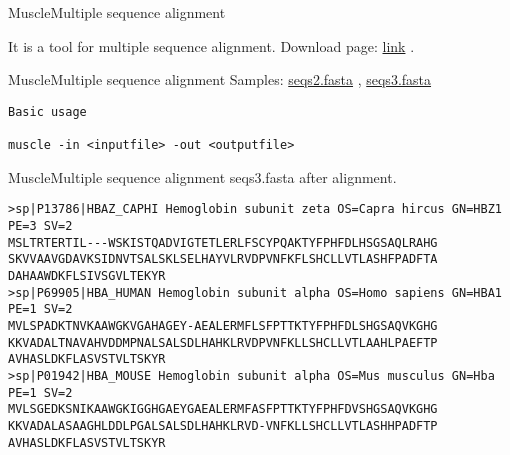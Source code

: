 \documentclass[10pt]{beamer}
\newcommand{\chref}[2]{	\href{#1}{{\usebeamercolor[bg]{Feather}#2}} }
\newcommand{\chref}[2]{	\href{#1}{{\color{blue}#2}}}
\newcommand{\1}{
	\setbeamertemplate{background}{
		\texttt{[image: img/1]}
		\tikz[overlay] \fill[fill opacity=0.75,fill=white] (0,0) rectangle (-\paperwidth,\paperheight);
	}
}
\begin{document}
\begin{frame}[fragile]{Muscle}{Multiple sequence alignment}
	\begin{block}{}
		It is a tool for multiple sequence alignment. Download page: \chref{http://www.drive5.com/muscle/downloads.htm}{link}.
	\end{block}
\end{frame}

\begin{frame}[fragile]{Muscle}{Multiple sequence alignment}
Samples: \chref{https://drive.google.com/file/d/11DYDDj3K5bn7mLcINEBQk8luO-HGsvgH/view?usp=sharing}{seqs2.fasta}, \chref{https://drive.google.com/file/d/1lPPD36R8e_BLvq2SxMvPWVyWHXtrJ-lz/view?usp=sharing}{seqs3.fasta}
\begin{lstlisting}[style=python]
Basic usage

muscle -in <inputfile> -out <outputfile>

\end{lstlisting}
\end{frame}


\begin{frame}[fragile]{Muscle}{Multiple sequence alignment}
	seqs3.fasta after alignment.
	\begin{lstlisting}[style=python]	
>sp|P13786|HBAZ_CAPHI Hemoglobin subunit zeta OS=Capra hircus GN=HBZ1 PE=3 SV=2 
MSLTRTERTIL---WSKISTQADVIGTETLERLFSCYPQAKTYFPHFDLHSGSAQLRAHG
SKVVAAVGDAVKSIDNVTSALSKLSELHAYVLRVDPVNFKFLSHCLLVTLASHFPADFTA
DAHAAWDKFLSIVSGVLTEKYR
>sp|P69905|HBA_HUMAN Hemoglobin subunit alpha OS=Homo sapiens GN=HBA1 PE=1 SV=2 
MVLSPADKTNVKAAWGKVGAHAGEY-AEALERMFLSFPTTKTYFPHFDLSHGSAQVKGHG
KKVADALTNAVAHVDDMPNALSALSDLHAHKLRVDPVNFKLLSHCLLVTLAAHLPAEFTP
AVHASLDKFLASVSTVLTSKYR
>sp|P01942|HBA_MOUSE Hemoglobin subunit alpha OS=Mus musculus GN=Hba PE=1 SV=2 
MVLSGEDKSNIKAAWGKIGGHGAEYGAEALERMFASFPTTKTYFPHFDVSHGSAQVKGHG
KKVADALASAAGHLDDLPGALSALSDLHAHKLRVD-VNFKLLSHCLLVTLASHHPADFTP
AVHASLDKFLASVSTVLTSKYR	
	\end{lstlisting}
\end{frame}
\end{document}
